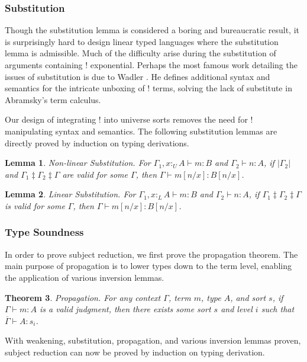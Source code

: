 \documentclass[sigplan,screen,review,authordraft]{acmart}
\newtheorem{theorem}{Theorem}[section]
\newtheorem{lemma}[theorem]{Lemma}
\theoremstyle{definition}
\newcommand{\pure}[1]{|#1|}
\newcommand{\utype}{:_{\scriptscriptstyle U}}
\newcommand{\ltype}{:_{\scriptscriptstyle L}}
\newcommand{\mrg}[3]{#1\ddagger#2\ddagger#3}
\begin{document}
  \subsubsection{Substitution} \label{subst}
  Though the substitution lemma is considered a boring and bureaucratic result, it is surprisingly hard to design linear typed languages where the substitution lemma is admissible. Much of the difficulty arise during the substitution of arguments containing ! exponential. Perhaps the most famous work detailing the issues of substitution is due to Wadler \cite{substitute}. He defines additional syntax and semantics for the intricate unboxing of ! terms, solving the lack of substitute in Abramsky's term calculus.

  Our design of integrating ! into universe sorts removes the need for ! manipulating syntax and semantics. The following substitution lemmas are directly proved by induction on typing derivations.

  \begin{lemma} 
    Non-linear Substitution. For $\Gamma_1, x \utype A \vdash m : B$ and $\Gamma_2 \vdash n : A$, if $\pure{\Gamma_2}$ and $\mrg{\Gamma_1}{\Gamma_2}{\Gamma}$ are valid for some $\Gamma$, then $\Gamma \vdash m[n/x] : B[n/x]$.
  \end{lemma}

  \begin{lemma} 
    Linear Substitution. For $\Gamma_1, x \ltype A \vdash m : B$ and $\Gamma_2 \vdash n : A$, if $\mrg{\Gamma_1}{\Gamma_2}{\Gamma}$ is valid for some $\Gamma$, then $\Gamma \vdash m[n/x] : B[n/x]$.
  \end{lemma}

  \subsubsection{Type Soundness}
  In order to prove subject reduction, we first prove the propagation theorem. The main purpose of propagation is to lower types down to the term level, enabling the application of various inversion lemmas.

  \begin{theorem} 
    Propagation. For any context $\Gamma$, term $m$, type $A$, and sort $s$, if $\Gamma \vdash m : A$ is a valid judgment, then there exists some sort $s$ and level $i$ such that $\overline{\Gamma} \vdash A : s_i$.
    \label{propagation}
  \end{theorem}

  With weakening, substitution, propagation, and various inversion lemmas proven, subject reduction can now be proved by induction on typing derivation.
\end{document}
